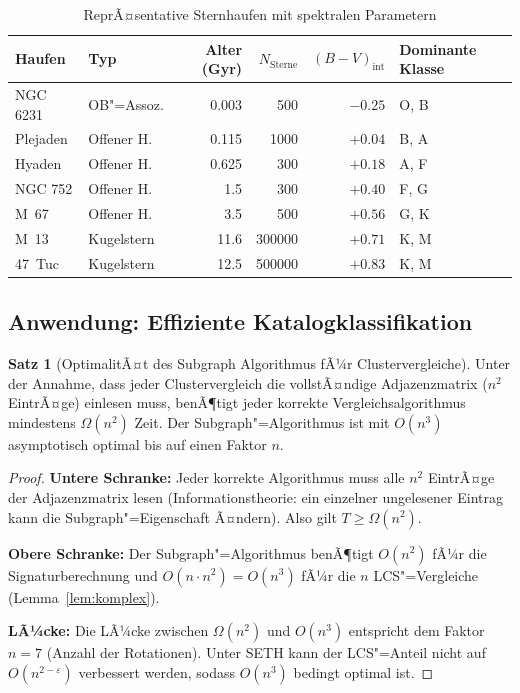 ﻿\documentclass[a4paper,12pt]{article}
\theoremstyle{definition}
\newtheorem{satz}{Satz}
\begin{document}
\begin{table}[ht]
\centering
\caption{ReprÃ¤sentative Sternhaufen mit spektralen Parametern}
\label{tab:haufen}
\small
\begin{tabular}{llrrrl}
\toprule
\textbf{Haufen} & \textbf{Typ} & \textbf{Alter (Gyr)} &
\textbf{$N_{\text{Sterne}}$} & \textbf{$(B-V)_{\text{int}}$} &
\textbf{Dominante Klasse} \\
\midrule
NGC 6231   & OB"=Assoz.     & 0.003 &    500 & $-0.25$ & O, B \\
Plejaden   & Offener H.     & 0.115 &   1000 & $+0.04$ & B, A \\
Hyaden     & Offener H.     & 0.625 &    300 & $+0.18$ & A, F \\
NGC 752    & Offener H.     & 1.5   &    300 & $+0.40$ & F, G \\
M~67       & Offener H.     & 3.5   &    500 & $+0.56$ & G, K \\
M~13       & Kugelstern     & 11.6  & 300000 & $+0.71$ & K, M \\
47~Tuc     & Kugelstern     & 12.5  & 500000 & $+0.83$ & K, M \\
\bottomrule
\end{tabular}
\end{table}

\subsection{Anwendung: Effiziente Katalogklassifikation}

\begin{satz}[OptimalitÃ¤t des Subgraph Algorithmus fÃ¼r Clustervergleiche]
\label{satz:opt_cluster}
    Unter der Annahme, dass jeder Clustervergleich die vollstÃ¤ndige
    Adjazenzmatrix ($n^2$ EintrÃ¤ge) einlesen muss, benÃ¶tigt jeder
    korrekte Vergleichsalgorithmus mindestens $\Omega(n^2)$ Zeit.
    Der Subgraph"=Algorithmus ist mit $O(n^3)$ asymptotisch optimal
    bis auf einen Faktor $n$.
\end{satz}

\begin{proof}
    \textbf{Untere Schranke:} Jeder korrekte Algorithmus muss alle $n^2$
    EintrÃ¤ge der Adjazenzmatrix lesen (Informationstheorie: ein einzelner
    ungelesener Eintrag kann die Subgraph"=Eigenschaft Ã¤ndern).
    Also gilt $T \geq \Omega(n^2)$.

    \textbf{Obere Schranke:} Der Subgraph"=Algorithmus benÃ¶tigt
    $O(n^2)$ fÃ¼r die Signaturberechnung und $O(n \cdot n^2) = O(n^3)$
    fÃ¼r die $n$ LCS"=Vergleiche (Lemma~\ref{lem:komplex}).

    \textbf{LÃ¼cke:} Die LÃ¼cke zwischen $\Omega(n^2)$ und $O(n^3)$
    entspricht dem Faktor $n = 7$ (Anzahl der Rotationen).
    Unter SETH kann der LCS"=Anteil nicht auf $O(n^{2-\varepsilon})$
    verbessert werden, sodass $O(n^3)$ bedingt optimal ist. \qedhere
\end{proof}
\end{document}
